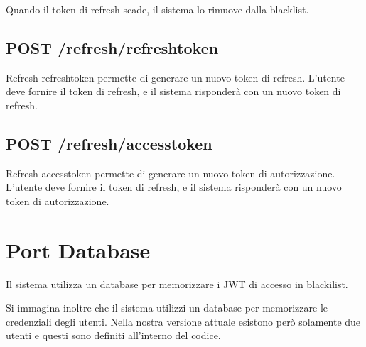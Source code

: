 Quando il token di refresh scade, il sistema lo rimuove dalla blacklist.

\subsection{POST /refresh/refreshtoken}

Refresh refreshtoken permette di generare un nuovo token di refresh. L'utente deve fornire il token di refresh, e il sistema risponderà con un nuovo token di refresh.

\subsection{POST /refresh/accesstoken}

Refresh accesstoken permette di generare un nuovo token di autorizzazione. L'utente deve fornire il token di refresh, e il sistema risponderà con un nuovo token di autorizzazione.

\section{Port Database}

Il sistema utilizza un database per memorizzare i JWT di accesso in blackilist.

Si immagina inoltre che il sistema utilizzi un database per memorizzare le credenziali degli utenti. Nella nostra versione attuale esistono però solamente due utenti e questi sono definiti all'interno del codice.


